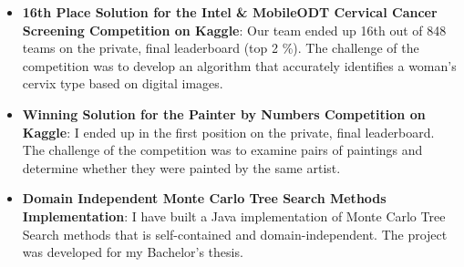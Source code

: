 \documentclass[letterpaper,11pt]{article}
\newcommand{\resumeItem}[2]{
  \item\small{
    \textbf{#1}{: #2 \vspace{-2pt}}
  }
}
\newcommand{\resumeSubItem}[2]{\resumeItem{#1}{#2}\vspace{-4pt}}
\newcommand{\resumeSubHeadingListStart}{\begin{itemize}[leftmargin=*]}
\newcommand{\resumeSubHeadingListEnd}{\end{itemize}}
\begin{document}
  \resumeSubHeadingListStart
    \resumeSubItem{16th Place Solution for the Intel \& MobileODT Cervical Cancer Screening Competition on Kaggle}
      { Our team ended up 16th out of 848 teams on the private, final leaderboard (top 2 \%). The challenge of the competition was to develop an algorithm that accurately identifies a woman’s cervix type based on digital images.}
  \resumeSubHeadingListEnd

  \resumeSubHeadingListStart
    \resumeSubItem{Winning Solution for the Painter by Numbers Competition on Kaggle}
      {I ended up in the first position on the private, final leaderboard. The challenge of the competition was to examine pairs of paintings and determine whether they were painted by the same artist.}
  \resumeSubHeadingListEnd

  \resumeSubHeadingListStart
    \resumeSubItem{Domain Independent Monte Carlo Tree Search Methods Implementation}
      {I have built a Java implementation of Monte Carlo Tree Search methods that is self-contained and domain-independent. The project was developed for my Bachelor’s thesis.}
  \resumeSubHeadingListEnd


\end{document}
